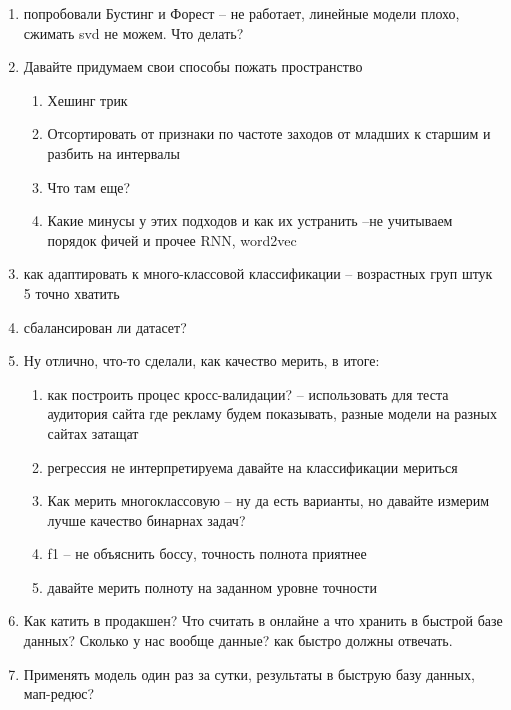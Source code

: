 \documentclass[a4paper, 12pt]{article}
\begin{document}
\begin{enumerate}
\begin{enumerate}
\begin{enumerate}
	\end{enumerate}
	\item попробовали Бустинг и Форест -- не работает, линейные модели плохо, сжимать svd не можем. Что делать?
	\item Давайте придумаем свои способы пожать пространство 
		\begin{enumerate}
			\item Хешинг трик
			\item Отсортировать от признаки по частоте заходов от младших к старшим и разбить на интервалы
			\item Что там еще?
			\item Какие минусы у этих подходов и как их устранить --не учитываем порядок фичей и прочее RNN, word2vec
		\end{enumerate}
	\item как адаптировать к много-классовой классификации -- возрастных груп штук 5 точно хватить
	\item сбалансирован ли датасет?
	\item Ну отлично, что-то сделали, как качество мерить, в итоге:
	\begin{enumerate}
		\item как построить процес кросс-валидации? -- использовать для теста аудитория сайта где рекламу будем показывать, разные модели на разных сайтах затащат
		\item регрессия не интерпретируема давайте на классификации мериться 
		\item Как мерить многоклассовую -- ну да есть варианты, но давайте измерим лучше качество бинарнах задач?
		\item f1 -- не объяснить боссу, точность полнота приятнее 
		\item давайте мерить полноту на заданном уровне точности
	\end{enumerate}
	\item Как катить в продакшен? Что считать в онлайне а что хранить в быстрой базе данных? Сколько у нас вообще данные? как быстро должны отвечать.
	\item Применять модель один раз за сутки, результаты в быструю базу данных, мап-редюс?
	\end{enumerate}
\end{enumerate}

	
\end{document}

